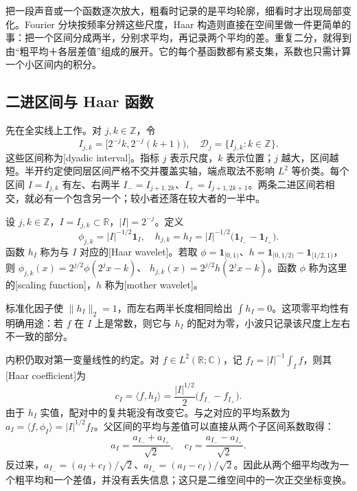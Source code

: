 
把一段声音或一个函数逐次放大，粗看时记录的是平均轮廓，细看时才出现局部变化。Fourier 分块按频率分辨这些尺度，Haar 构造则直接在空间里做一件更简单的事：把一个区间分成两半，分别求平均，再记录两个平均的差。重复二分，就得到由“粗平均＋各层差值”组成的展开。它的每个基函数都有紧支集，系数也只需计算一个小区间内的积分。

\subsection{二进区间与 Haar 函数}
\label{b2:subsec:190601}

先在全实线上工作。对 \(j,k\in\mathbb Z\)，令
\[
 I_{j,k}=[2^{-j}k,2^{-j}(k+1)),
 \quad \mathcal D_j=\{I_{j,k}:k\in\mathbb Z\}.
\]
这些区间称为[dyadic interval]。指标 \(j\) 表示尺度，\(k\) 表示位置；\(j\) 越大，区间越短。半开约定使同层区间严格不交并覆盖实轴，端点取法不影响 \(L^2\) 等价类。每个区间 \(I=I_{j,k}\) 有左、右两半
\(I_-=I_{j+1,2k}\)、\(I_+=I_{j+1,2k+1}\)。两条二进区间若相交，就必有一个包含另一个；较小者还落在较大者的一半中。

\begin{definition}\label{b2:def:19-haar-functions}
设 \(j,k\in\mathbb Z\)，\(I=I_{j,k}\subset\mathbb R\)，\(|I|=2^{-j}\)。定义
\begin{equation}\label{b2:eq:19-haar-functions}
 \phi_{j,k}=|I|^{-1/2}\mathbf1_I,
 \quad
 h_{j,k}=h_I=|I|^{-1/2}
   \bigl(\mathbf1_{I_-}-\mathbf1_{I_+}\bigr).
\end{equation}
函数 \(h_I\) 称为与 \(I\) 对应的[Haar wavelet]。若取
\(\phi=\mathbf1_{[0,1)}\)、\(h=\mathbf1_{[0,1/2)}-\mathbf1_{[1/2,1)}\)，则
\(\phi_{j,k}(x)=2^{j/2}\phi(2^jx-k)\)、
\(h_{j,k}(x)=2^{j/2}h(2^jx-k)\)。函数 \(\phi\) 称为这里的[scaling function]，\(h\) 称为[mother wavelet]。
\end{definition}

标准化因子使 \(\|h_I\|_2=1\)，而左右两半长度相同给出 \(\int h_I=0\)。这项零平均性有明确用途：若 \(f\) 在 \(I\) 上是常数，则它与 \(h_I\) 的配对为零，小波只记录该尺度上左右不一致的部分。

内积仍取对第一变量线性的约定。对 \(f\in L^2(\mathbb R;\mathbb C)\)，记
\(f_I=|I|^{-1}\int_I f\)，则其[Haar coefficient]为
\begin{equation}\label{b2:eq:19-haar-coefficients}
 c_I=\langle f,h_I\rangle
 =\frac{|I|^{1/2}}2\bigl(f_{I_-}-f_{I_+}\bigr).
\end{equation}
由于 \(h_I\) 实值，配对中的复共轭没有改变它。与之对应的平均系数为
\(a_I=\langle f,\phi_I\rangle=|I|^{1/2}f_I\)。父区间的平均与差值可以直接从两个子区间系数取得：
\begin{equation}\label{b2:eq:19-haar-two-scale}
 a_I=\frac{a_{I_-}+a_{I_+}}{\sqrt2},
 \quad c_I=\frac{a_{I_-}-a_{I_+}}{\sqrt2}.
\end{equation}
反过来，\(a_{I_-}=(a_I+c_I)/\sqrt2\)、\(a_{I_+}=(a_I-c_I)/\sqrt2\)。因此从两个细平均改为一个粗平均和一个差值，并没有丢失信息；这只是二维空间中的一次正交坐标变换。

